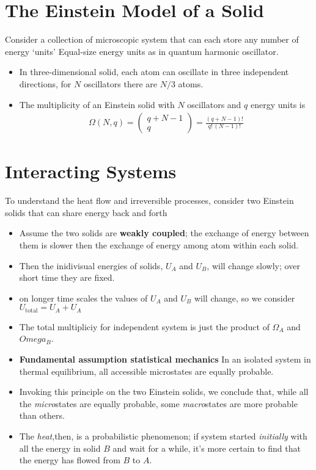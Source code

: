 \documentclass{book}
\begin{document}
\section{The Einstein Model of a Solid}%
\label{sec:einstein model}

Consider a collection of microscopic system that can each store any number of energy `units'
Equal-size energy units as in quantum harmonic oscillator.
\begin{itemize}
	\item In three-dimensional solid, each atom can oscillate in three independent directions, for $N$
	      oscillators there are $N/3$ atoms.
	\item The multiplicity of an Einstein solid with $N$ oscillators and $q$
	      energy units is
	      \begin{align}
		      \label{eq:einstein omega}
		      \Omega(N, q) = \begin{pmatrix}
			                     q + N -1 \\ q
		                     \end{pmatrix} =
		      \frac{(q+N-1)!}{q! \, (N-1)!}
	      \end{align}
\end{itemize}


\section{Interacting Systems}%
\label{sec:Interacting Systems}

To understand the heat flow and irreversible processes, consider two Einstein solids that can
share energy back and forth

\begin{itemize}
  \item Assume the two solids are \textbf{weakly coupled}; the exchange of energy between them
				is slower then the exchange of energy among atom within each solid.
  \item Then the inidivisual energies of solids, $U_A$ and $U_B$, will change slowly;
    over short time they are fixed.
    \item on longer time scales the values of $U_A$ and $U_B$ will change, so we consider
      $U_\text{total} = U_A + U_A$
   \item The total multipliciy for independent system is just the product of $\Omega_A$ and $Omega_B$.
   \item \textbf{Fundamental assumption statistical mechanics} In an isolated system
    in thermal equilibrium, all accessible microstates are equally probable.
    \item Invoking this principle on the two Einstein solids, we conclude that, while all the
      \textit{micro}states are equally probable, some \textit{macro}states are more probable than others.
      \item The \textit{heat},then, is a probabilistic phenomenon; if system started \textit{initially}
        with all the energy in solid $B$ and wait for a while, it's more certain to find that the
        energy has flowed from $B$ to $A$.


\end{itemize}
\end{document}
